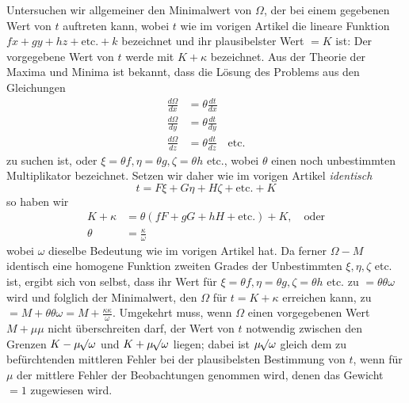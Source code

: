 Untersuchen wir allgemeiner den Minimalwert von \(\Omega\), der bei einem gegebenen Wert von \(t\) auftreten kann, wobei \(t\) wie im vorigen Artikel die lineare Funktion \(fx+gy+hz+\text{etc.}+k\) bezeichnet und ihr plausibelster Wert \(=K\) ist: Der vorgegebene Wert von \(t\) werde mit \(K+\kappa\) bezeichnet. Aus der Theorie der Maxima und Minima ist bekannt, dass die Lösung des Problems aus den Gleichungen
\[
\begin{aligned}
\frac{d\Omega}{dx}&=\theta\frac{dt}{dx}\\[3pt]
\frac{d\Omega}{dy}&=\theta\frac{dt}{dy}\\[3pt]
\frac{d\Omega}{dz}&=\theta\frac{dt}{dz}\quad\text{etc.}
\end{aligned}
\]
zu suchen ist, oder \(\xi=\theta f,\allowbreak\eta=\theta g,\allowbreak\zeta=\theta h\) etc., wobei \(\theta\) einen noch unbestimmten Multiplikator bezeichnet. Setzen wir daher wie im vorigen Artikel \textit{identisch}
\[
t=F\xi+G\eta+H\zeta+\text{etc.}+K
\]
so haben wir
\[
\begin{aligned}
K+\kappa&=\theta(fF+gG+hH+\text{etc.})+K,\quad\text{oder}\\[3pt]
\theta&=\frac{\kappa}{\omega}
\end{aligned}
\]
wobei \(\omega\) dieselbe Bedeutung wie im vorigen Artikel hat. Da ferner \(\Omega-M\) identisch eine homogene Funktion zweiten Grades der Unbestimmten \(\xi,\eta,\zeta\) etc. ist, ergibt sich von selbst, dass ihr Wert für \(\xi=\theta f,\allowbreak\eta=\theta g,\allowbreak\zeta=\theta h\) etc. zu \(=\theta\theta\omega\) wird und folglich der Minimalwert, den \(\Omega\) für \(t=K+\kappa\) erreichen kann, zu \(=M+\theta\theta\omega=M+\frac{\kappa\kappa}{\omega}\). Umgekehrt muss, wenn \(\Omega\) einen vorgegebenen Wert \(M+\mu\mu\) nicht überschreiten darf, der Wert von \(t\) notwendig zwischen den Grenzen \(K-\mu\mathord{{}^{}\!\surd}\omega\) und \(K+\mu\mathord{{}^{}\!\surd}\omega\) liegen; dabei ist \(\mu\mathord{{}^{}\!\surd}\omega\) gleich dem zu befürchtenden mittleren Fehler bei der plausibelsten Bestimmung von \(t\), wenn für \(\mu\) der mittlere Fehler der Beobachtungen genommen wird, denen das Gewicht \(=1\) zugewiesen wird.

\clearpage
